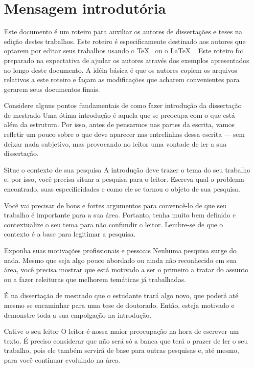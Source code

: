 \section{Mensagem introdutória}
Este documento é um roteiro para auxiliar os autores de
dissertações e teses na edição destes trabalhos.
Este roteiro é especificamente destinado aos autores que optarem
por editar seus trabalhos usando o \TeX\ \cite{knuth:tex,texbook} ou o \LaTeX\ \cite{lamport:latex,latexbook}.
Este roteiro foi preparado na expectativa de ajudar os autores
através dos exemplos apresentados ao longo deste documento. A
idéia básica é que os autores copiem os arquivos
relativos a este roteiro e façam as modificações que
acharem convenientes para gerarem seus documentos finais.

Considere alguns pontos fundamentais de como fazer introdução da dissertação de mestrado
Uma ótima introdução é aquela que se preocupa com o que está além da estrutura. Por isso, antes de pensarmos nas partes da escrita, vamos refletir um pouco sobre o que deve aparecer nas entrelinhas dessa escrita — sem deixar nada subjetivo, mas provocando no leitor uma vontade de ler a sua dissertação.

Situe o contexto de sua pesquisa
A introdução deve trazer o tema do seu trabalho e, por isso, você precisa situar a pesquisa para o leitor. Escreva qual o problema encontrado, suas especificidades e como ele se tornou o objeto de sua pesquisa.

Você vai precisar de bons e fortes argumentos para convencê-lo de que seu trabalho é importante para a sua área. Portanto, tenha muito bem definido e contextualize o seu tema para não confundir o leitor. Lembre-se de que o contexto é a base para legitimar a pesquisa.

Exponha suas motivações profissionais e pessoais
Nenhuma pesquisa surge do nada. Mesmo que seja algo pouco abordado ou ainda não reconhecido em sua área, você precisa mostrar que está motivado a ser o primeiro a tratar do assunto ou a fazer releituras que melhorem temáticas já trabalhadas.

É na dissertação de mestrado que o estudante trará algo novo, que poderá até mesmo se encaminhar para uma tese de doutorado. Então, esteja motivado e demonstre toda a sua empolgação na introdução.

Cative o seu leitor
O leitor é nossa maior preocupação na hora de escrever um texto. É preciso considerar que não será só a banca que terá o prazer de ler o seu trabalho, pois ele também servirá de base para outras pesquisas e, até mesmo, para você continuar evoluindo na área.

